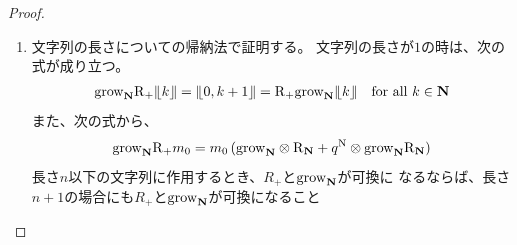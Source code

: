{\begin{proof}
\begin{enumerate}
			との交換関係から次の式が成り立つ。
			\begin{equation*}\begin{split}
				\code_\sizen\grow\beta 
				= m_0\plr{1\otimes\opR_+}\plr{\code_\sizen\otimes\code_\sizen}
					\plr{\grow\otimes1 + q^{\opN}\otimes\grow} \\
			\end{split}\end{equation*}
			任意の$r,s\le n$に対して、$\clB_r\otimes\clB_s$に作用させると、
			帰納法の仮定と命題\ref{eq:自然数列の成長その一}から、
			次の式が成り立ち、
			\begin{equation*}\begin{split}
				& \code_\sizen\grow\beta\plr{\clB_r\otimes\clB_s} \\
				&= m_0\plr{1\otimes\opR_+}\plr{\code_\sizen\otimes\code_\sizen}
					\plr{\grow\otimes1 + q^{\opN}\otimes\grow}
					\plr{\clB_r\otimes\clB_s} \\
				&= m_0\plr{1\otimes\opR_+}
					\plr{\grow_\sizen\otimes1 + q^{\opN}\otimes\grow_\sizen}
					\plr{\code_\sizen\otimes\code_\sizen}
					\plr{\clB_r\otimes\clB_s} \\
				&= m_0\plr{\grow_\sizen\otimes1 + q^{\opN}\otimes\grow_\sizen}
					\plr{1\otimes\opR_+}
					\plr{\code_\sizen\otimes\code_\sizen}
					\plr{\clB_r\otimes\clB_s} \\
				&= \grow_\sizen\code_\sizen\beta\plr{\clB_r\otimes\clB_s}
			\end{split}\end{equation*}
			次数が$n+1$でも命題が成り立つことがわかる。
			\item 文字列の長さについての帰納法で証明する。
			文字列の長さが$1$の時は、次の式が成り立つ。
			\begin{equation*}\begin{split}
				{\mathinner{\operatorname{grow}}}_{\mathbf{N}}{\mathinner{\operatorname{R}}}_+{|\!\lfloor{k}\rfloor\!|} = {|\!\lfloor{0,k+1}\rfloor\!|}
				= {\mathinner{\operatorname{R}}}_+{\mathinner{\operatorname{grow}}}_{\mathbf{N}}{|\!\lfloor{k}\rfloor\!|} \quad\text{for all } k\in\mathbf{N}
			\end{split}\end{equation*}
			また、次の式から、
			\begin{equation*}\begin{split}
				{\mathinner{\operatorname{grow}}}_{\mathbf{N}}{\mathinner{\operatorname{R}}}_+m_0 = m_0\mathinner{({{\mathinner{\operatorname{grow}}}_{\ensuremath{\mathbf{N}}}\otimes{\mathinner{\operatorname{R}}}_{\ensuremath{\mathbf{N}}}+ q^{\mathinner{\operatorname{N}}}\otimes{\mathinner{\operatorname{grow}}}_{\ensuremath{\mathbf{N}}}{\mathinner{\operatorname{R}}}_{\ensuremath{\mathbf{N}}}})}
			\end{split}\end{equation*}
			長さ$n$以下の文字列に作用するとき、$R_+$と${\mathinner{\operatorname{grow}}}_{\mathbf{N}}$が可換に
			なるならば、長さ$n+1$の場合にも$R_+$と${\mathinner{\operatorname{grow}}}_{\mathbf{N}}$が可換になること

\end{enumerate}
\end{proof}}
